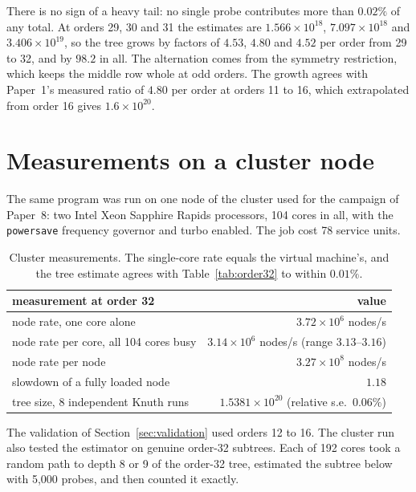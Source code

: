 \noindent There is no sign of a heavy tail: no single probe contributes more than $0.02\%$ of any total.
At orders 29, 30 and 31 the estimates are $1.566\times10^{18}$, $7.097\times10^{18}$ and
$3.406\times10^{19}$, so the tree grows by factors of $4.53$, $4.80$ and $4.52$ per order from 29 to 32,
and by $98.2$ in all. The alternation comes from the symmetry restriction, which keeps the middle row
whole at odd orders. The growth agrees with Paper~1's measured ratio of $4.80$ per order at orders 11 to
16, which extrapolated from order 16 gives $1.6\times10^{20}$.

\section{Measurements on a cluster node}
\label{sec:cluster}
The same program was run on one node of the cluster used for the campaign of Paper~8: two Intel Xeon
Sapphire Rapids processors, 104 cores in all, with the \texttt{powersave} frequency governor and turbo
enabled. The job cost 78 service units.

\begin{table}[H]
\centering
\small
\begin{tabular}{@{}lr@{}}
\toprule
measurement at order 32 & value \\
\midrule
node rate, one core alone & $3.72\times10^6$ nodes/s \\
node rate per core, all 104 cores busy & $3.14\times10^6$ nodes/s (range $3.13$--$3.16$) \\
node rate per node & $3.27\times10^8$ nodes/s \\
slowdown of a fully loaded node & $1.18$ \\
tree size, 8 independent Knuth runs & $1.5381\times10^{20}$ (relative s.e.\ $0.06\%$) \\
\bottomrule
\end{tabular}
\caption{Cluster measurements. The single-core rate equals the virtual machine's, and the tree estimate
agrees with Table~\ref{tab:order32} to within $0.01\%$.}
\label{tab:cluster}
\end{table}

The validation of Section~\ref{sec:validation} used orders 12 to 16. The cluster run also tested the
estimator on genuine order-32 subtrees. Each of 192 cores took a random path to depth 8 or 9 of the
order-32 tree, estimated the subtree below with 5{,}000 probes, and then counted it exactly.

